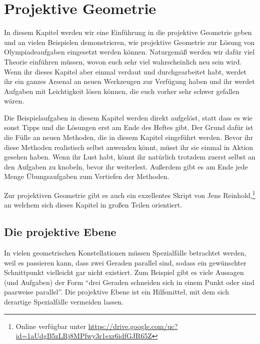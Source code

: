 \section{Projektive Geometrie}\label{kapitel:ProjektiveGeometrie}
In diesem Kapitel werden wir eine Einführung in die projektive Geometrie geben und an vielen Beispielen demonstrieren, wie projektive Geometrie zur Lösung von Olympiadeaufgaben eingesetzt werden können. Naturgemäß werden wir dafür viel Theorie einführen müssen, wovon euch sehr viel wahrscheinlich neu sein wird. Wenn ihr dieses Kapitel aber einmal verdaut und durchgearbeitet habt, werdet ihr ein ganzes Arsenal an neuen Werkzeugen zur Verfügung haben und ihr werdet Aufgaben mit Leichtigkeit lösen können, die euch vorher sehr schwer gefallen wären.

Die Beispielaufgaben in diesem Kapitel werden direkt aufgelöst, statt dass es wie sonst Tipps und die Lösungen erst am Ende des Heftes gibt. Der Grund dafür ist die Fülle an neuen Methoden, die in diesem Kapitel eingeführt werden. Bevor ihr diese Methoden realistisch selbst anwenden könnt, müsst ihr sie einmal in Aktion gesehen haben. Wenn ihr Lust habt, könnt ihr natürlich trotzdem zuerst selbst an den Aufgaben zu knobeln, bevor ihr weiterlest. Außerdem gibt es am Ende jede Menge Übungsaufgaben zum Vertiefen der Methoden.

Zur projektiven Geometrie gibt es auch ein exzellentes Skript von Jens Reinhold,\footnote{Online verfügbar unter \url{https://drive.google.com/uc?id=1aUdgB5zLRj8MPfwy3r1exr6idfGJR65Z}} an welchem sich dieses Kapitel in großen Teilen orientiert.

\subsection*{Die projektive Ebene}
In vielen geometrischen Konstellationen müssen Spezialfälle betrachtet werden, weil es passieren kann, dass zwei Geraden parallel sind, sodass ein gewünschter Schnittpunkt vielleicht gar nicht existiert. Zum Beispiel gibt es viele Aussagen (und Aufgaben) der Form \enquote{drei Geraden schneiden sich in einem Punkt oder sind paarweise parallel}. Die projektive Ebene ist ein Hilfsmittel, mit dem sich derartige Spezialfälle vermeiden lassen.

